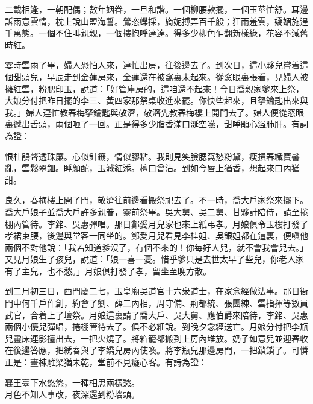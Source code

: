 \begin{myquote}
二載相逢，一朝配偶；數年姻眷，一旦和諧。一個柳腰款擺，一個玉莖忙舒。耳邊訴雨意雲情，枕上說山盟海誓。鶯恣蝶採，旖妮搏弄百千般；狂雨羞雲，嬌媚施逞千萬態。一個不住叫親親，一個摟抱呼達達。得多少柳色乍翻新樣綠，花容不減舊時紅。
\end{myquote}

霎時雲雨了畢，婦人恐怕人來，連忙出房，往後邊去了。到次日，這小夥兒嘗着這個甜頭兒，早辰走到金蓮房來，金蓮還在被窩裏未起來。從窓眼裏張看，見婦人被擁紅雲，粉腮印玉，說道：「好管庫房的，這咱還不起來！今日喬親家爹來上祭，大娘分付把昨日擺的李三、黃四家那祭桌收進來罷。你快些起來，且拏鑰匙出來與我。」婦人連忙教春梅拏鑰匙與敬濟，敬濟先教春梅樓上開門去了。婦人便從窓眼裏遞出舌頭，兩個咂了一回。正是得多少脂香滿口涎空嚥，甜唾顒心溢肺肝。有詞為證：

\begin{myquote}
恨杜鵑聲透珠簾。心似針籤，情似膠粘。我則見笑臉腮窩愁粉黛，瘦損春纖寶髻亂，雲鬆翠鈿。睡顏酡，玉減紅添。檀口曾沾。到如今唇上猶香，想起來口內猶甜。
\end{myquote}

良久，春梅樓上開了門，敬濟往前邊看搬祭祀去了。不一時，喬大戶家祭來擺下。喬大戶娘子並喬大戶許多親眷，靈前祭畢。吳大舅、吳二舅、甘夥計陪侍，請至捲棚內管待。李銘、吳惠彈唱。那日鄭愛月兒家也來上紙弔孝。月娘俱令玉樓打發了孝裙束腰，後邊與堂客一同坐的。鄭愛月兒看見李桂姐、吳銀姐都在這裏，便嗔他兩個不對他說：「我若知道爹沒了，有個不來的！你每好人兒，就不會我會兒去。」又見月娘生了孩兒，說道：「娘一喜一憂。惜乎爹只是去世太早了些兒，你老人家有了主兒，也不愁。」月娘俱打發了孝，留坐至晚方散。

到二月初三日，西門慶二七，玉皇廟吳道官十六衆道士，在家念經做法事。那日衙門中何千戶作創，約會了劉、薛二內相，周守備、荊都統、張團練、雲指揮等數員武官，合着上了壇祭。月娘這裏請了喬大戶、吳大舅、應伯爵來陪待，李銘、吳惠兩個小優兒彈唱，捲棚管待去了。俱不必細說。到晚夕念經送亡。月娘分付把李瓶兒靈床連影擡出去，一把火燒了。將箱籠都搬到上房內堆放。奶子如意兒並迎春收在後邊答應，把綉春與了李嬌兒房內使喚。將李瓶兒那邊房門，一把鎖鎖了。可憐正是：畫棟雕梁猶未乾，堂前不見癡心客。有詩為證：

\begin{myquote}
襄王臺下水悠悠，一種相思兩樣愁。\\月色不知人事改，夜深還到粉墻頭。
\end{myquote}

